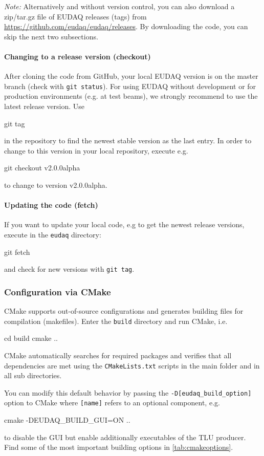 \textit{Note:} Alternatively and without version control, you can also download a zip/tar.gz file of EUDAQ releases (tags) from \url{https://github.com/eudaq/eudaq/releases}. 
By downloading the code, you can skip the next two subsections. 

\paragraph{Changing to a release version (checkout)}
After cloning the code from GitHub, your local EUDAQ version is on the master branch (check with \texttt{git status}).  
For using EUDAQ without development or for production environments (e.g. at test beams), we strongly recommend to use the latest release version. 
Use 
\begin{listing}[mybash]
git tag 
\end{listing}
in the repository to find the newest stable version as the last entry.
In order to change to this version in your local repository, execute e.g. 
\begin{listing}[mybash]
git checkout v2.0.0alpha
\end{listing}
to change to version v2.0.0alpha.

\paragraph{Updating the code (fetch)}
If you want to update your local code, e.g to get the newest release versions, execute in the \texttt{eudaq} directory: 
\begin{listing}[mybash]
git fetch
\end{listing}
and check for new versions with \texttt{git tag}. 


\subsubsection{Configuration via CMake}
\label{sec:cmake}
CMake supports out-of-source configurations and generates building files for compilation (makefiles). 
Enter the \texttt{build} directory and run CMake, i.e.
\begin{listing}[mybash]
cd build
cmake ..
\end{listing}
CMake automatically searches for required packages and verifies that all dependencies are met using the \texttt{CMakeLists.txt} scripts in the main folder and in all sub directories. 

You can modify this default behavior by passing the \texttt{-D[eudaq\_build\_option]} option to
CMake where \texttt{[name]} refers to an optional component, e.g.
\begin{listing}[mybash]
cmake -DEUDAQ_BUILD_GUI=ON  ..
\end{listing}
to disable the GUI but enable additionally executables of the TLU producer.
Find some of the most important building options in \autoref{tab:cmakeoptions}.

